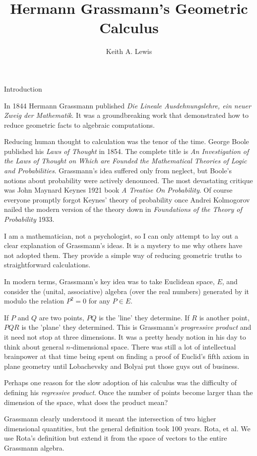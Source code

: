 \documentclass[fleqn]{amsart}
\title{Hermann Grassmann's Geometric Calculus}
\author{Keith A. Lewis}
\begin{document}
\maketitle

\begin{section}{Introduction}

In 1844 Hermann Grassmann published {\em Die Lineale Ausdehnungslehre,
ein neuer Zweig der Mathematik}. It was a groundbreaking work that
demonstrated how to reduce geometric facts to algebraic computations.

Reducing human thought to calculation was the tenor of the time. George
Boole published his {\em Laws of Thought} in 1854. The complete title
is {\em An Investigation of the Laws of Thought on Which are Founded
the Mathematical Theories of Logic and Probabilities}. Grassmann's idea
suffered only from neglect, but Boole's notions about probability were
actively denounced. The most devastating critique was John Maynard Keynes
1921 book {\em A Treatise On Probability}.  Of course everyone promptly
forgot Keynes' theory of probability once Andrei Kolmogorov nailed the
modern version of the theory down in {\em Foundations of the Theory of
Probability} 1933.

I am a mathematician, not a psychologist, so I can only attempt to lay
out a clear explanation of Grassmann's ideas. It is a mystery to me
why others have not adopted them. They provide a simple way of reducing
geometric truths to straightforward calculations.

In modern terms, Grassmann's key idea was to take Euclidean space, $E$, and 
consider the (unital, associative) algebra (over the real numbers)
generated by it modulo the relation $P^2 = 0$ for any $P\in E$.

If $P$ and $Q$ are two points, $PQ$ is the 'line' they determine. If
$R$ is another point, $PQR$ is the 'plane' they determined. This is
Grassmann's {\em progressive product} and it need not stop at
three dimensions. It was a pretty heady notion in
his day to think about general $n$-dimensional space. There was still
a lot of intellectual brainpower at that time being spent on finding a
proof of Euclid's fifth axiom in plane geometry until Lobachevsky and
Bolyai put those guys out of business.

Perhaps one reason for the slow adoption of his calculus was the
difficulty of defining his {\em regressive product}. Once the number
of points become larger than the dimension of the space, what does the
product mean?

Grassmann clearly understood it meant the intersection of two higher
dimensional quantities, but the general definition took 100 years. Rota,
et al. We use Rota's definition but extend it from the space of
vectors to the entire Grassmann algebra.

\end{section}
\end{document}
